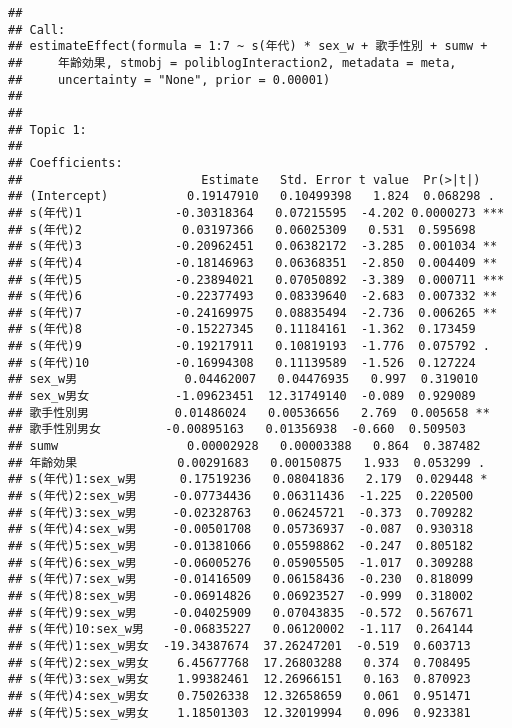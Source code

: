 \documentclass[
]{article}
\begin{document}
\begin{verbatim}
## 
## Call:
## estimateEffect(formula = 1:7 ~ s(年代) * sex_w + 歌手性別 + sumw + 
##     年齢効果, stmobj = poliblogInteraction2, metadata = meta, 
##     uncertainty = "None", prior = 0.00001)
## 
## 
## Topic 1:
## 
## Coefficients:
##                         Estimate   Std. Error t value  Pr(>|t|)    
## (Intercept)           0.19147910   0.10499398   1.824  0.068298 .  
## s(年代)1             -0.30318364   0.07215595  -4.202 0.0000273 ***
## s(年代)2              0.03197366   0.06025309   0.531  0.595698    
## s(年代)3             -0.20962451   0.06382172  -3.285  0.001034 ** 
## s(年代)4             -0.18146963   0.06368351  -2.850  0.004409 ** 
## s(年代)5             -0.23894021   0.07050892  -3.389  0.000711 ***
## s(年代)6             -0.22377493   0.08339640  -2.683  0.007332 ** 
## s(年代)7             -0.24169975   0.08835494  -2.736  0.006265 ** 
## s(年代)8             -0.15227345   0.11184161  -1.362  0.173459    
## s(年代)9             -0.19217911   0.10819193  -1.776  0.075792 .  
## s(年代)10            -0.16994308   0.11139589  -1.526  0.127224    
## sex_w男               0.04462007   0.04476935   0.997  0.319010    
## sex_w男女            -1.09623451  12.31749140  -0.089  0.929089    
## 歌手性別男            0.01486024   0.00536656   2.769  0.005658 ** 
## 歌手性別男女         -0.00895163   0.01356938  -0.660  0.509503    
## sumw                  0.00002928   0.00003388   0.864  0.387482    
## 年齢効果              0.00291683   0.00150875   1.933  0.053299 .  
## s(年代)1:sex_w男      0.17519236   0.08041836   2.179  0.029448 *  
## s(年代)2:sex_w男     -0.07734436   0.06311436  -1.225  0.220500    
## s(年代)3:sex_w男     -0.02328763   0.06245721  -0.373  0.709282    
## s(年代)4:sex_w男     -0.00501708   0.05736937  -0.087  0.930318    
## s(年代)5:sex_w男     -0.01381066   0.05598862  -0.247  0.805182    
## s(年代)6:sex_w男     -0.06005276   0.05905505  -1.017  0.309288    
## s(年代)7:sex_w男     -0.01416509   0.06158436  -0.230  0.818099    
## s(年代)8:sex_w男     -0.06914826   0.06923527  -0.999  0.318002    
## s(年代)9:sex_w男     -0.04025909   0.07043835  -0.572  0.567671    
## s(年代)10:sex_w男    -0.06835227   0.06120002  -1.117  0.264144    
## s(年代)1:sex_w男女  -19.34387674  37.26247201  -0.519  0.603713    
## s(年代)2:sex_w男女    6.45677768  17.26803288   0.374  0.708495    
## s(年代)3:sex_w男女    1.99382461  12.26966151   0.163  0.870923    
## s(年代)4:sex_w男女    0.75026338  12.32658659   0.061  0.951471    
## s(年代)5:sex_w男女    1.18501303  12.32019994   0.096  0.923381    

\end{verbatim}
\end{document}
